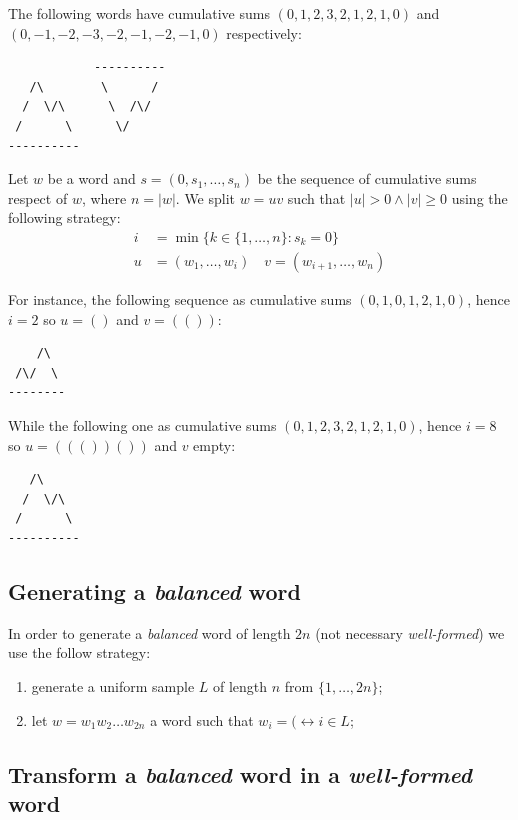 The following words have cumulative sums $(0,1,2,3,2,1,2,1,0)$ and\\
$(0,-1,-2,-3,-2,-1,-2,-1,0)$ respectively:
\begin{verbatim}
            ----------
   /\        \      /
  /  \/\      \  /\/
 /      \      \/
----------
\end{verbatim}
Let $w$ be a word and $s = (0, s_1, \ldots, s_n)$ be the sequence of
cumulative sums respect of $w$, where $n = |w|$. We split $w= uv$ such
that $|u|>0 \wedge |v| \geq 0$ using the following strategy:
\begin{displaymath}
  \begin{split}
    i &=    \min\{k\in\{1,\ldots,n\}:s_k = 0 \}\\
    u &= (w_1,\ldots,w_i) \quad v = (w_{i+1},\ldots,w_n)
  \end{split}
\end{displaymath}

For instance, the following sequence as cumulative sums
$(0,1,0,1,2,1,0)$, hence $i = 2$ so $u=()$ and $v=(())$:
\begin{verbatim}
    /\
 /\/  \   
--------
\end{verbatim}
While the following one as cumulative sums $(0, 1, 2, 3, 2, 1,
2,1,0)$, hence $i = 8$ so $u=((())())$ and $v$ empty:
\begin{verbatim}
   /\
  /  \/\
 /      \ 
----------
\end{verbatim}

\subsection{Generating a \emph{balanced} word}

In order to generate a \emph{balanced} word of length $2n$ (not
necessary \emph{well-formed}) we use the follow strategy:
\begin{enumerate}
\item generate a uniform sample $L$ of length $n$ from
  $\{1,\ldots,2n\}$;
\item let $w = w_1w_2\ldots w_{2n}$ a word such that $w_i = (
  \leftrightarrow i \in L$;
\end{enumerate}

\subsection{Transform a \emph{balanced} word in a \emph{well-formed}
  word}

